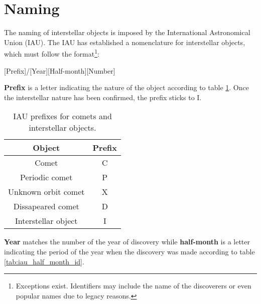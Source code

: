 \section{Naming}

The naming of interstellar objects is imposed by the International Astronomical
Union (IAU). The IAU has established a nomenclature for interstellar objects,
which must follow the format\footnote{Exceptions exist. Identifiers may include
  the name of the discoverers or even popular names due to legacy reasons.}:

\begin{center}
  [Prefix]/[Year][Half-month][Number]
\end{center}

\textbf{Prefix} is a letter indicating the nature of the object according to
table \ref{tab:iau_prefixes}. Once the interstellar nature has been confirmed,
the prefix sticks to I.

\begin{table}[H]
  \centering
  \begin{tabular}{|c|c|}
    \hline
    \textbf{Object}     & \textbf{Prefix} \\
    \hline
    Comet               & C               \\
    Periodic comet      & P               \\
    Unknown orbit comet & X               \\
    Dissapeared comet   & D               \\
    Interstellar object & I               \\
    \hline
  \end{tabular}
  \caption{IAU prefixes for comets and interstellar objects.}
  \label{tab:iau_prefixes}
\end{table}

\textbf{Year} matches the number of the year of discovery while
\textbf{half-month} is a letter indicating the period of the year when the
discovery was made according to table \ref{tab:iau_half_month_id}.

